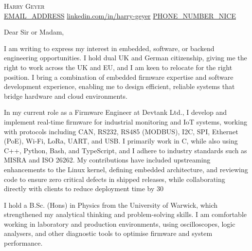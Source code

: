 \documentclass[10.5pt]{letter}
\begin{document}
\date{\today}
\subject{Job application}

\AddToShipoutPictureBG{
    \color{gr}
    \AtPageUpperLeft{\rule[-1.3in]{\paperwidth}{1.3in}}
}
\begin{center}{\fontsize{28}{0}\selectfont\scshape Harry Geyer} \\
    \href{mailto:EMAIL_ADDRESS}{\faEnvelope\enspace EMAIL_ADDRESS}\hfill
    \href{https://linkedin.com/in/harry-geyer}{\faLinkedinIn\enspace linkedin.com/in/harry-geyer}\hfill
    \href{tel:PHONE_NUMBER_BASIC}{\faPhone\enspace PHONE_NUMBER_NICE}\hfill \\
    \faDesktop{}\hfill
    \faGithub{} \hfill
    \faMapMarker{}\hfill
\end{center}

\opening{Dear Sir or Madam,}

\vspace{-0.1in}\setlength\parindent{24pt}
\noindent

I am writing to express my interest in embedded, software, or backend engineering opportunities. I hold dual UK and German citizenship, giving me the right to work across the UK and EU, and I am keen to relocate for the right position. I bring a combination of embedded firmware expertise and software development experience, enabling me to design efficient, reliable systems that bridge hardware and cloud environments.

In my current role as a Firmware Engineer at Devtank Ltd., I develop and implement real-time firmware for industrial monitoring and IoT systems, working with protocols including CAN, RS232, RS485 (MODBUS), I2C, SPI, Ethernet (PoE), Wi-Fi, LoRa, UART, and USB. I primarily work in C, while also using C++, Python, Bash, and TypeScript, and I adhere to industry standards such as MISRA and ISO 26262. My contributions have included upstreaming enhancements to the Linux kernel, defining embedded architecture, and reviewing code to ensure zero critical defects in shipped releases, while collaborating directly with clients to reduce deployment time by 30%

I hold a B.Sc. (Hons) in Physics from the University of Warwick, which strengthened my analytical thinking and problem-solving skills. I am comfortable working in laboratory and production environments, using oscilloscopes, logic analysers, and other diagnostic tools to optimise firmware and system performance.
\end{document}
